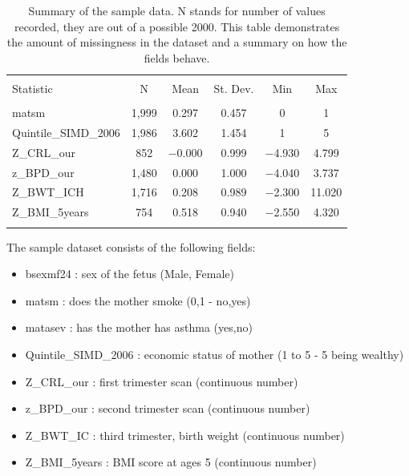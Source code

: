 \documentclass[bsc]{abdnthesis}
\begin{document}
\begin{table}[H] \centering 
  \caption{Summary of the sample data. N stands for number of values recorded, they are out of a possible 2000. This table demonstrates the amount of missingness in the dataset and a summary on how the fields behave.} 
  \label{abdn-summary} 
\begin{tabular}{@{\extracolsep{5pt}}lccccc} 
\\[-1.8ex]\hline 
\hline \\[-1.8ex] 
Statistic & \multicolumn{1}{c}{N} & \multicolumn{1}{c}{Mean} & \multicolumn{1}{c}{St. Dev.} & \multicolumn{1}{c}{Min} & \multicolumn{1}{c}{Max} \\ 
\hline \\[-1.8ex] 
matsm & 1,999 & 0.297 & 0.457 & 0 & 1 \\ 
Quintile\_SIMD\_2006 & 1,986 & 3.602 & 1.454 & 1 & 5 \\ 
Z\_CRL\_our & 852 & $-$0.000 & 0.999 & $-$4.930 & 4.799 \\ 
z\_BPD\_our & 1,480 & 0.000 & 1.000 & $-$4.040 & 3.737 \\ 
Z\_BWT\_ICH & 1,716 & 0.208 & 0.989 & $-$2.300 & 11.020 \\ 
Z\_BMI\_5years & 754 & 0.518 & 0.940 & $-$2.550 & 4.320 \\ 
\hline \\[-1.8ex] 
\end{tabular} 
\end{table} 

The sample dataset consists of the following fields:

\begin{itemize}
	\item bsexmf24 : sex of the fetus (Male, Female)
	\item matsm : does the mother smoke (0,1 - no,yes)
	\item matasev : has the mother has asthma (yes,no)
	\item Quintile\_SIMD\_2006 : economic status of mother (1 to 5 - 5 being wealthy)
	\item Z\_CRL\_our : first trimester scan (continuous number)
	\item z\_BPD\_our : second trimester scan (continuous number)
	\item Z\_BWT\_IC : third trimester, birth weight (continuous number)
	\item Z\_BMI\_5years : BMI score at ages 5 (continuous number)
\end{itemize}
\end{document}
